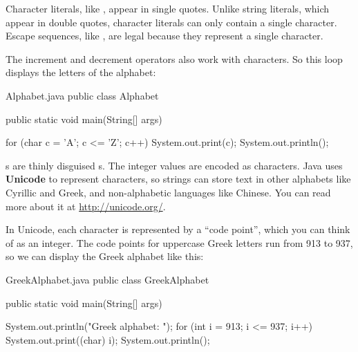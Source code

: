 
Character literals, like , appear in single quotes.
Unlike string literals, which appear in double quotes, character literals can only contain a single character.
Escape sequences, like , are legal because they represent a single character.

The increment and decrement operators also work with characters.
So this loop displays the letters of the alphabet:

\begin{trinket} [195] {Alphabet.java}
public class Alphabet {
    public static void main(String[] args) {
       
       for (char c = 'A'; c <= 'Z'; c++) {
          System.out.print(c);
       }
       System.out.println();
    }
}
\end{trinket}
s are thinly disguised s.  The integer values are encoded as characters.
Java uses {\bf Unicode} to represent characters, so strings can store text in other alphabets like Cyrillic and Greek, and non-alphabetic languages like Chinese.
You can read more about it at \url{http://unicode.org/}.

In Unicode, each character is represented by a ``code point'', which you can think of as an integer.
The code points for uppercase Greek letters run from 913 to 937, so we can display the Greek alphabet like this:

\begin{trinket} [210] {GreekAlphabet.java}
public class GreekAlphabet {
    public static void main(String[] args) {
       
       System.out.println("Greek alphabet: ");
       for (int i = 913; i <= 937; i++) {
          System.out.print((char) i);
       }
       System.out.println();
    }
}
\end{trinket}

